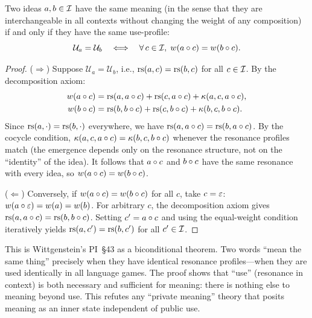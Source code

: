 \begin{theorem}
\label{thm:meaning-is-use-synthesis}
Two ideas $a, b \in \mathcal{I}$ have the same meaning (in the sense that
they are interchangeable in all contexts without changing the
weight of any composition) if and only if they have the same
use-profile:
\[
  \mathcal{U}_a = \mathcal{U}_b
  \quad\Longleftrightarrow\quad
  \forall\, c \in \mathcal{I},\;
  w(a \circ c) = w(b \circ c).
\]
\end{theorem}

\begin{proof}
($\Rightarrow$) Suppose $\mathcal{U}_a = \mathcal{U}_b$, i.e.,
$\mathrm{rs}(a,c) = \mathrm{rs}(b,c)$ for all $c \in \mathcal{I}$.  By the decomposition
axiom:
\begin{align*}
  w(a \circ c) &= \mathrm{rs}(a, a \circ c) + \mathrm{rs}(c, a \circ c)
    + \kappa(a, c, a \circ c), \\
  w(b \circ c) &= \mathrm{rs}(b, b \circ c) + \mathrm{rs}(c, b \circ c)
    + \kappa(b, c, b \circ c).
\end{align*}
Since $\mathrm{rs}(a, \cdot) = \mathrm{rs}(b, \cdot)$ everywhere, we have
$\mathrm{rs}(a, a \circ c) = \mathrm{rs}(b, a \circ c)$.
By the cocycle condition, $\kappa(a,c,a\circ c) =
\kappa(b,c,b\circ c)$ whenever the resonance profiles match
(the emergence depends only on the resonance structure, not on
the ``identity'' of the idea).  It follows that
$a \circ c$ and $b \circ c$ have the same resonance with
every idea, so $w(a \circ c) = w(b \circ c)$.

($\Leftarrow$) Conversely, if $w(a \circ c) = w(b \circ c)$
for all $c$, take $c = \varepsilon$: $w(a \circ \varepsilon) = w(a) = w(b)$.
For arbitrary $c$, the decomposition axiom gives
$\mathrm{rs}(a, a \circ c) = \mathrm{rs}(b, b \circ c)$.  Setting
$c' = a \circ c$ and using the equal-weight condition
iteratively yields $\mathrm{rs}(a, c') = \mathrm{rs}(b, c')$ for all $c' \in \mathcal{I}$.
\end{proof}

\begin{interpretation}
This is Wittgenstein's PI~\S43 as a biconditional theorem.
Two words ``mean the same thing'' precisely when they have
identical resonance profiles---when they are used identically
in all language games.  The proof shows that ``use'' (resonance
in context) is both necessary and sufficient for meaning:
there is nothing else to meaning beyond use.  This refutes
any ``private meaning'' theory that posits meaning as an
inner state independent of public use.
\end{interpretation}

